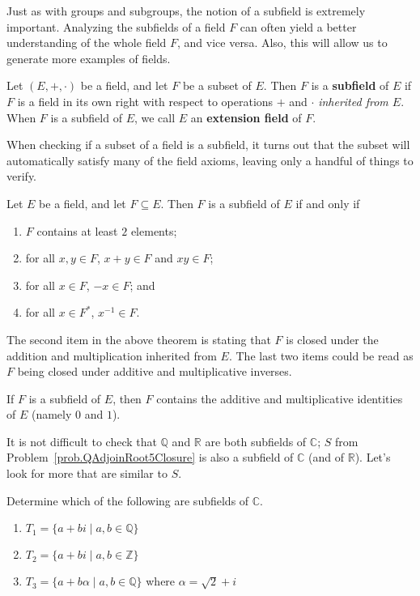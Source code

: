 Just as with groups and subgroups, the notion of a subfield is extremely important. Analyzing the subfields of a field $F$ can often yield a better understanding of the whole field $F$, and vice versa. Also, this will allow us to generate  more examples of fields.

\begin{definition}
Let $(E,+,\cdot)$ be a field, and let $F$ be a subset of $E$. Then $F$ is a \textbf{subfield} of $E$ if $F$ is a field in its own right with respect to operations $+$ and $\cdot$ \emph{inherited from $E$}. When $F$ is a subfield of $E$, we call $E$  an \textbf{extension field} of $F$.
\end{definition}

When checking if a subset of a field is a subfield, it turns out that the subset will automatically satisfy many of the field axioms, leaving only a handful of things to verify.

\begin{theorem}
Let $E$ be a field, and let $F\subseteq E$. Then $F$ is a subfield of $E$ if and only if 
\begin{enumerate}
\item $F$ contains at least $2$ elements;
\item for all $x,y\in F$, $x+y\in F$ and  $xy\in F$;
\item for all $x\in F$, $-x\in F$; and 
\item for all $x\in F^*$, $x^{-1}\in F$.
\end{enumerate}
\end{theorem}

The second item in the above theorem is stating that $F$ is closed under the addition and multiplication inherited from $E$. The last two items could be read as $F$ being closed under additive and multiplicative inverses.

\begin{theorem}\label{thm.SubfieldContains01}
If $F$ is a subfield of $E$, then $F$ contains the additive and multiplicative identities of $E$ (namely $0$ and $1$).
\end{theorem}

It is not difficult to check that $\mathbb{Q}$ and $\mathbb{R}$ are both subfields of $\mathbb{C}$; $S$ from Problem~\ref{prob.QAdjoinRoot5Closure} is also a subfield of $\mathbb{C}$ (and of $\mathbb{R}$). Let's look for more that are similar to $S$.

\begin{problem}\label{prob.SubfieldRoot2PlusI}
Determine which of the following are subfields of $\mathbb{C}$.
\begin{enumerate}
\item\label{prob.SubfieldRoot2PlusI.QAdjoinI} $T_1=\{a+bi\mid a,b\in \mathbb{Q}\}$
\item $T_2=\{a+bi\mid a,b\in \mathbb{Z}\}$
\item\label{prob.SubfieldRoot2PlusI.QAdjoinRoot2PlusI} $T_3=\{a+b\alpha\mid a,b\in \mathbb{Q}\}$ where  $\alpha = \sqrt{2} + i$
\end{enumerate}
\end{problem}


